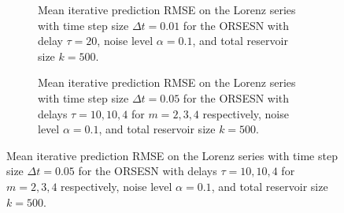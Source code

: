 \begin{figure}
    \centering

    \begin{subfigure}{\textwidth}
        \caption{Mean iterative prediction RMSE on the Lorenz series with time step size $\Delta t = 0.01$ for the ORSESN with delay $\tau=20$, noise level $\alpha=0.1$, and total reservoir size $k=500$.}
        \label{fig:ORSESN_iterative_0_01}
        \centering
    \end{subfigure}

    \vspace{0.5em}

    \begin{subfigure}{\textwidth}
        \caption{Mean iterative prediction RMSE on the Lorenz series with time step size $\Delta t=0.05$ for the ORSESN with delays $\tau=10,10,4$ for $m=2,3,4$ respectively, noise level $\alpha=0.1$, and total reservoir size $k=500$.}
        \label{fig:ORSESN_iterative_0_05}
        \centering
    \end{subfigure}


\end{figure}
